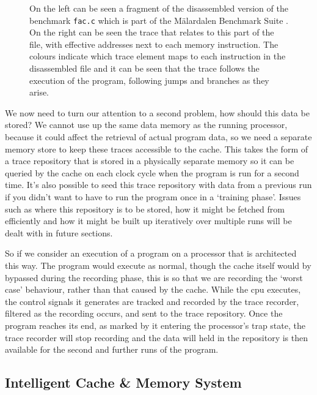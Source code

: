 \begin{figure}[htbp]
	
	\caption[Program Fragment with Trace]{On the left can be seen a fragment of the disassembled version of the benchmark \texttt{fac.c} which is part of the Mälardalen Benchmark Suite \cite{gustafssonMalardalenWCETBenchmarks2010}. On the right can be seen the trace that relates to this part of the file, with effective addresses next to each memory instruction. The colours indicate which trace element maps to each instruction in the disassembled file and it can be seen that the trace follows the execution of the program, following jumps and branches as they arise.}
	\label{fig:trace-with-original}
\end{figure}

We now need to turn our attention to a second problem, how should this data be stored? We cannot use up the same data memory as the running processor, because it could affect the retrieval of actual program data, so we need a separate memory store to keep these traces accessible to the cache. This takes the form of a trace repository that is stored in a physically separate memory so it can be queried by the cache on each clock cycle when the program is run for a second time. It's also possible to seed this trace repository with data from a previous run if you didn't want to have to run the program once in a `training phase'. Issues such as where this repository is to be stored, how it might be fetched from efficiently and how it might be built up iteratively over multiple runs will be dealt with in future sections. 

So if we consider an execution of a program on a processor that is architected this way. The program would execute as normal, though the cache itself would by bypassed during the recording phase, this is so that we are recording the `worst case' behaviour, rather than that caused by the cache. While the \gls{cpu} executes, the control signals it generates are tracked and recorded by the trace recorder, filtered as the recording occurs, and sent to the trace repository. Once the program reaches its end, as marked by it entering the processor's trap state, the trace recorder will stop recording and the data will held in the repository is then available for the second and further runs of the program.

\subsection{Intelligent Cache \& Memory System}

